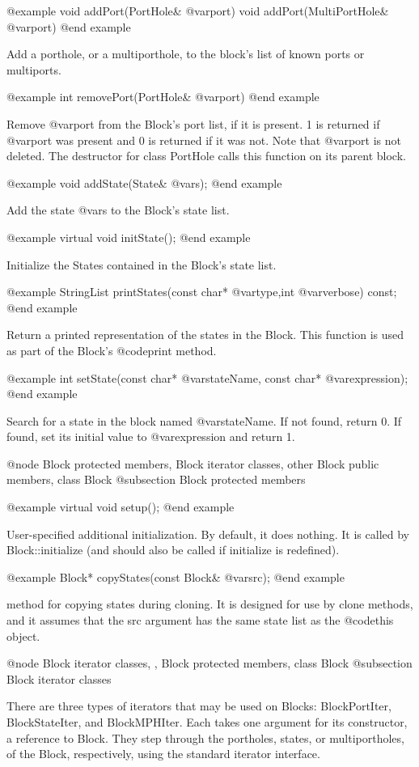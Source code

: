 @example
void addPort(PortHole& @var{port})
void addPort(MultiPortHole& @var{port})
@end example

Add a porthole, or a multiporthole, to the block's list of known ports
or multiports.

@example
int removePort(PortHole& @var{port})
@end example

Remove @var{port} from the Block's port list, if it is present.
1 is returned if @var{port} was present and 0 is returned if it
was not.  Note that @var{port} is not deleted.  The destructor
for class PortHole calls this function on its parent block.

@example
void addState(State& @var{s});
@end example

Add the state @var{s} to the Block's state list.

@example
virtual void initState();
@end example

Initialize the States contained in the Block's state list.

@example
StringList printStates(const char* @var{type},int @var{verbose}) const;
@end example

Return a printed representation of the states in the Block.  This
function is used as part of the Block's @code{print} method.

@example
int setState(const char* @var{stateName}, const char* @var{expression});
@end example

Search for a state in the block named @var{stateName}.  If not found,
return 0.  If found, set its initial value to @var{expression} and
return 1.

@node Block protected members, Block iterator classes, other Block public members, class Block
@subsection Block protected members

@example
virtual void setup();
@end example

User-specified additional initialization.  By default, it does nothing.
It is called by Block::initialize (and should also be called if
initialize is redefined).

@example
Block* copyStates(const Block& @var{src});
@end example

method for copying states during cloning.  It is designed for use
by clone methods, and it assumes that the src argument has the same
state list as the @code{this} object.

@node Block iterator classes,  , Block protected members, class Block
@subsection Block iterator classes

There are three types of iterators that may be used on Blocks:
BlockPortIter, BlockStateIter, and BlockMPHIter.
Each takes one argument for its constructor, a reference to Block.
They step through the portholes, states, or multiportholes, of the
Block, respectively, using the standard iterator interface.

